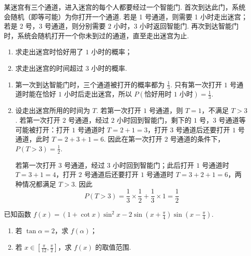 \begin{problem}
某迷宫有三个通道，进入迷宫的每个人都要经过一个智能门. 首次到达此门，系统会随机（即等可能）为你打开一个通道. 若是 1 号通道，则需要 1 小时走出迷宫；若是 2 号，3 号通道，则分别需要 2 小时，3 小时返回智能门. 再次到达智能门时，系统会随机打开一个你未到过的通道，直至走出迷宫为止.
\begin{enumerate}
\item 求走出迷宫时恰好用了 \(1\) 小时的概率；
\item 求走出迷宫的时间超过 \(3\) 小时的概率.
\end{enumerate}
\end{problem}

\begin{solution}
\begin{enumerate}
\item 第一次到达智能门时，三个通道被打开的概率都为 \(\frac{1}{3}\). 只有第一次打开 \(1\) 号通道时能在恰好 \(1\) 小时后走出迷宫，所以 \(P(\text{恰好用时 }1\text{ 小时})=\frac{1}{3}\).

\item 设走出迷宫所用的时间为 \(T\). 若第一次打开 \(1\) 号通道，则 \(T=1\)，不满足 \(T>3\). 若第一次打开 \(2\) 号通道，经过 \(2\) 小时回到智能门，剩下的 \(1\) 号，\(3\) 号通道等可能被打开：打开 \(1\) 号通道时 \(T=2+1=3\)，打开 \(3\) 号通道后还要打开 \(1\) 号通道，此时 \(T=2+3+1=6\). 因此在第一次打开 \(2\) 号通道的条件下，\(P(T>3)=\frac{1}{2}\).

若第一次打开 \(3\) 号通道，经过 \(3\) 小时回到智能门；此后打开 \(1\) 号通道时 \(T=3+1=4\)，打开 \(2\) 号通道后还要打开 \(1\) 号通道时 \(T=3+2+1=6\)，两种情况都满足 \(T>3\). 因此
\[
P(T>3)=\frac{1}{3}\times\frac{1}{2}+\frac{1}{3}\times1=\frac{1}{2}
\]
\end{enumerate}
\end{solution}

\begin{problem}
已知函数 \(f(x) = (1 + \cot x)\sin^{2}x - 2\sin \left(x + \frac{\pi}{4}\right)\sin \left(x - \frac{\pi}{4}\right)\).
\begin{enumerate}
\item 若 \(\tan \alpha = 2\)，求 \(f(\alpha)\)；
\item 若 \(x \in \left[\frac{\pi}{12}, \frac{\pi}{2}\right]\)，求 \(f(x)\) 的取值范围.
\end{enumerate}
\end{problem}

